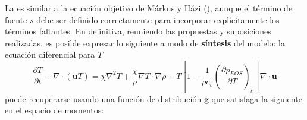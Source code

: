 La  es similar a la ecuaci\'on objetivo de M\'arkus y H\'azi (), aunque el t\'ermino de fuente $s$ debe ser definido correctamente para incorporar expl\'icitamente los t\'erminos faltantes. En definitiva, reuniendo las propuestas y suposiciones realizadas, es posible expresar lo siguiente a modo de \textbf{s\'intesis} del modelo: la ecuaci\'on diferencial para $T$
\begin{equation}
	\dfrac{\partial T}{\partial t} + \nabla \cdot (\bm{u} T) = \chi \nabla^2 T  + \dfrac{\chi}{\rho} \nabla T \cdot \nabla \rho + T \left[ 1 - \dfrac{1}{\rho c_v} \left( \dfrac{\partial p_{EOS}}{\partial T} \right)_{\rho} \right] \nabla \cdot \bm{u}
\end{equation}
puede recuperarse usando una funci\'on de distribuci\'on $\bm{g}$ que satisfaga la siguiente \lbe{} en el espacio de momentos:
